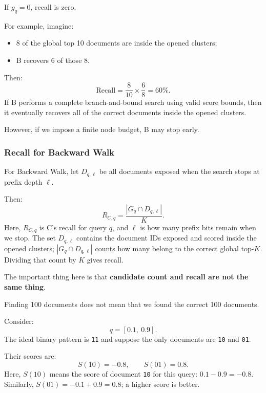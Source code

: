 If $g_q=0$, recall is zero.

For example, imagine:
\begin{itemize}\setlength{\itemsep}{1pt}
\item 8 of the global top 10 documents are inside the opened clusters;
\item B recovers 6 of those 8.
\end{itemize}
Then:
\[
\mathrm{Recall}=\frac{8}{10}\times\frac{6}{8}=60\%.
\]
If B performs a complete branch-and-bound search using valid score bounds, then it eventually recovers all of the correct documents inside the opened clusters.

However, if we impose a finite node budget, B may stop early.

\begin{center}\setlength{\fboxsep}{9pt}\end{center}

\subsubsection{Recall for Backward Walk}
For Backward Walk, let $D_{q,\ell}$ be all documents exposed when the search stops at prefix depth $\ell$.

Then:
\[
R_{C,q}=\frac{|G_q\cap D_{q,\ell}|}{K}.
\]
Here, $R_{C,q}$ is C's recall for query $q$, and $\ell$ is how many prefix bits remain when we stop. The set $D_{q,\ell}$ contains the document IDs exposed and scored inside the opened clusters; $|G_q\cap D_{q,\ell}|$ counts how many belong to the correct global top-$K$. Dividing that count by $K$ gives recall.

The important thing here is that \textbf{candidate count and recall are not the same thing}.

Finding 100 documents does not mean that we found the correct 100 documents.

Consider:
\[
q=[0.1,\ 0.9].
\]
The ideal binary pattern is \texttt{11} and suppose the only documents are \texttt{10} and \texttt{01}.

Their scores are:
\[
S(10)=-0.8,\qquad S(01)=0.8.
\]
Here, $S(10)$ means the score of document \texttt{10} for this query: $0.1-0.9=-0.8$. Similarly, $S(01)=-0.1+0.9=0.8$; a higher score is better.

